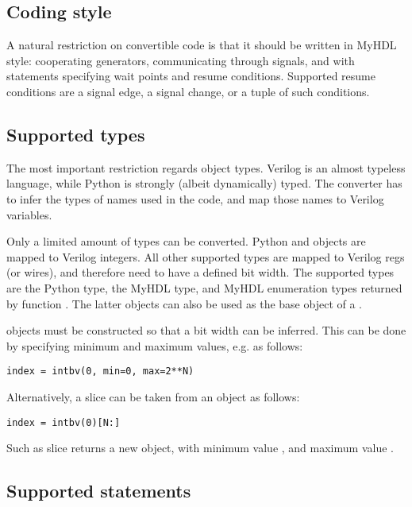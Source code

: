 \subsection{Coding style\label{conv-subset-style}}

A natural restriction on convertible code is that it should be
written in MyHDL style: cooperating generators, communicating through
signals, and with  statements specifying wait points and resume
conditions.  Supported resume conditions are a signal edge, a signal
change, or a tuple of such conditions.

\subsection{Supported types\label{conv-subset-types}}

The most important restriction regards object types. Verilog is an
almost typeless language, while Python is strongly (albeit
dynamically) typed. The converter has to infer the types of names
used in the code, and map those names to Verilog variables.

Only a limited amount of types can be converted.
Python  and  objects are mapped to Verilog
integers. All other supported types are mapped to Verilog regs (or
wires), and therefore need to have a defined bit width. The supported
types are the Python  type, the MyHDL  type,
and MyHDL enumeration types returned by function . The
latter objects can also be used as the base object of a
. 

 objects must be constructed so that a bit
width can be inferred. This can be done by specifying minimum
and maximum values, e.g. as follows:

\begin{verbatim}
index = intbv(0, min=0, max=2**N)
\end{verbatim}

Alternatively, a slice can be taken from an  object
as follows:

\begin{verbatim}
index = intbv(0)[N:]
\end{verbatim}

Such as slice returns a new  object, with minimum
value  , and maximum value .


\subsection{Supported statements\label{conv-subset-statements}}

